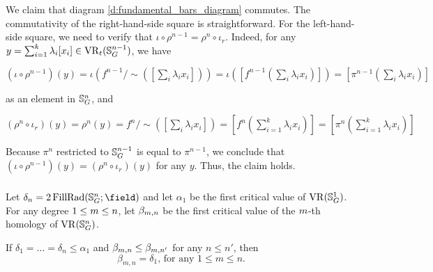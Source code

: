 We claim that diagram \eqref{d:fundamental_bars_diagram} commutes. 
The commutativity of the right-hand-side square is straightforward.
For the left-hand-side square, we need to verify that $\iota \circ \rho^{n-1}=\rho^{n} \circ \iota_r$.
Indeed, for any $y = \sum_{i=1}^k \lambda_i [x_i] \in \operatorname{VR}_t(\mathbb{S}^{n-1}_G)$, we have
\begin{center}
    $(\iota \circ \rho^{n-1})(y)
    =\iota(f^{n-1}/\sim([\sum_i \lambda_i x_i]))
    =\iota([f^{n-1}(\sum_i \lambda_i x_i)])
    =[\pi^{n-1}(\sum_i \lambda_i x_i)]
    $
\end{center}
as an element in $\mathbb{S}^n_G$, and
\begin{center}
    $(\rho^{n} \circ \iota_r)(y) = \rho^{n}(y) = f^{n}/\sim([\sum_i \lambda_i x_i]) = [f^{n}(\sum_{i=1}^k \lambda_i x_i)] = [\pi^{n}(\sum_{i=1}^k \lambda_i x_i)]
    $
\end{center}
Because $\pi^{n}$ restricted to $\mathbb{S}^{n-1}_G$ is equal to $\pi^{n-1}$, we conclude that $(\iota \circ \rho^{n-1})(y) = (\rho^n \circ \iota_r)(y)$ for any $y$.
Thus, the claim holds.

\subsubsection{}
\label{subsub:foundamental_bar_rpn}

Let $\delta_n=2\fillrad[\field]{\bS^n_G}$ and 
let $\alpha_1$ be the first critical value of $\operatorname{VR}(\mathbb{S}^1_G)$.
For any degree $1 \leq m \leq n$, let $\beta_{m, n}$ be the first critical value of the $m$-th homology of $\operatorname{VR}(\mathbb{S}^n_G)$. 

\medskip\lemma 
If $\delta_1 = \dots = \delta_n \leq \alpha_1$ and $\beta_{m, n} \leq \beta_{m, n'}$ for any $n\leq n'$, then
\[
\beta_{m, n} = \delta_1, \, \text{for any $1 \leq m \leq n$.}
\]

